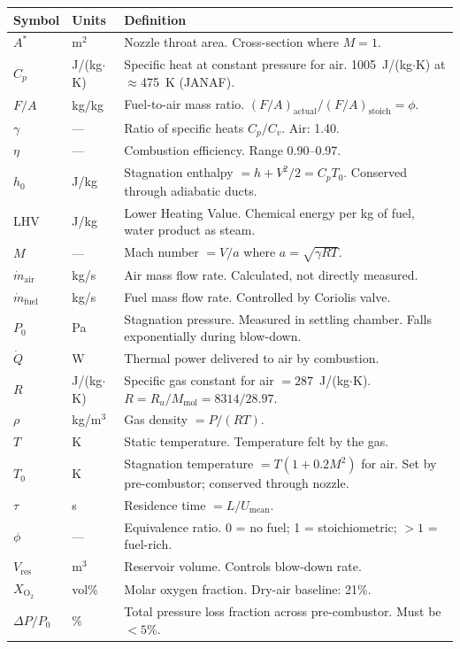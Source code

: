 \documentclass[12pt,a4paper]{report}
\begin{document}
\begin{center}
\renewcommand{\arraystretch}{1.5}
\begin{tabularx}{\linewidth}{@{}llX@{}}
  \toprule
  \textbf{Symbol} & \textbf{Units} & \textbf{Definition}\\
  \midrule
  $A^*$    & m$^2$  & Nozzle throat area. Cross-section where $M=1$.\\
  $C_p$    & J/(kg$\cdot$K) & Specific heat at constant pressure for air.
                              1005~J/(kg$\cdot$K) at $\approx$475~K (JANAF).\\
  $F/A$    & kg/kg  & Fuel-to-air mass ratio. $(F/A)_\text{actual}/
                       (F/A)_\text{stoich} = \phi$.\\
  $\gamma$ & —      & Ratio of specific heats $C_p/C_v$. Air: 1.40.\\
  $\eta$   & —      & Combustion efficiency. Range 0.90--0.97.\\
  $h_0$    & J/kg   & Stagnation enthalpy $= h+V^2/2 = C_p T_0$.
                       Conserved through adiabatic ducts.\\
  LHV      & J/kg   & Lower Heating Value. Chemical energy per kg of fuel,
                       water product as steam.\\
  $M$      & —      & Mach number $= V/a$ where $a=\sqrt{\gamma RT}$.\\
  $\dot{m}_\text{air}$ & kg/s & Air mass flow rate. Calculated, not directly measured.\\
  $\dot{m}_\text{fuel}$ & kg/s & Fuel mass flow rate. Controlled by Coriolis valve.\\
  $P_0$    & Pa     & Stagnation pressure. Measured in settling chamber.
                       Falls exponentially during blow-down.\\
  $\dot{Q}$ & W     & Thermal power delivered to air by combustion.\\
  $R$      & J/(kg$\cdot$K) & Specific gas constant for air $= 287$~J/(kg$\cdot$K).
                               $R = R_u/M_\text{mol} = 8314/28.97$.\\
  $\rho$   & kg/m$^3$ & Gas density $= P/(RT)$.\\
  $T$      & K      & Static temperature. Temperature felt by the gas.\\
  $T_0$    & K      & Stagnation temperature $= T(1+0.2M^2)$ for air.
                       Set by pre-combustor; conserved through nozzle.\\
  $\tau$   & s      & Residence time $= L/U_\text{mean}$.\\
  $\phi$   & —      & Equivalence ratio. 0 = no fuel; 1 = stoichiometric;
                       $>1$ = fuel-rich.\\
  $V_\text{res}$ & m$^3$ & Reservoir volume. Controls blow-down rate.\\
  $X_{\text{O}_2}$ & vol\% & Molar oxygen fraction. Dry-air baseline: 21\%.\\
  $\Delta P/P_0$ & \% & Total pressure loss fraction across pre-combustor.
                        Must be $<5\%$.\\
  \bottomrule
\end{tabularx}
\end{center}
\end{document}
